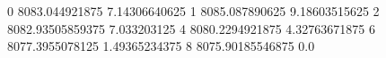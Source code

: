 0 8083.044921875 7.14306640625
1 8085.087890625 9.18603515625
2 8082.93505859375 7.033203125
4 8080.2294921875 4.32763671875
6 8077.3955078125 1.49365234375
8 8075.90185546875 0.0
